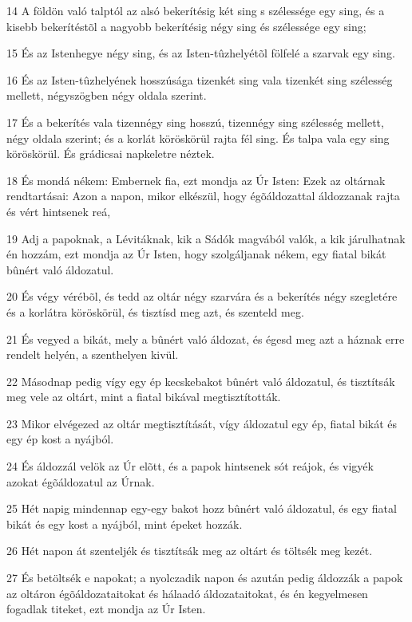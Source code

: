 \par 14 A földön való talptól az alsó bekerítésig két sing s szélessége egy sing, és a kisebb bekerítéstõl a nagyobb bekerítésig négy sing és szélessége egy sing;
\par 15 És az Istenhegye négy sing, és az Isten-tûzhelyétõl fölfelé a szarvak egy sing.
\par 16 És az Isten-tûzhelyének hosszúsága tizenkét sing vala tizenkét sing szélesség mellett, négyszögben négy oldala szerint.
\par 17 És a bekerítés vala tizennégy sing hosszú, tizennégy sing szélesség mellett, négy oldala szerint; és a korlát köröskörül rajta fél sing. És talpa vala egy sing köröskörül. És grádicsai napkeletre néztek.
\par 18 És mondá nékem: Embernek fia, ezt mondja az Úr Isten: Ezek az oltárnak rendtartásai: Azon a napon, mikor elkészül, hogy égõáldozattal áldozzanak rajta és vért hintsenek reá,
\par 19 Adj a papoknak, a Lévitáknak, kik a Sádók magvából valók, a kik járulhatnak én hozzám, ezt mondja az Úr Isten, hogy szolgáljanak nékem, egy fiatal bikát bûnért  való áldozatul.
\par 20 És végy vérébõl, és tedd az oltár négy szarvára és a bekerítés négy szegletére és a korlátra köröskörül, és tisztísd meg azt, és szenteld meg.
\par 21 És vegyed a bikát, mely a bûnért való áldozat, és égesd meg azt a háznak erre rendelt helyén, a szenthelyen kivül.
\par 22 Másodnap pedig vígy egy ép kecskebakot bûnért való áldozatul, és tisztítsák meg vele az oltárt, mint a fiatal bikával megtisztították.
\par 23 Mikor elvégezed az oltár megtisztítását, vígy áldozatul egy ép, fiatal bikát és egy ép kost a nyájból.
\par 24 És áldozzál velök az Úr elõtt, és a papok hintsenek sót reájok, és vigyék azokat égõáldozatul az Úrnak.
\par 25 Hét napig mindennap egy-egy bakot hozz bûnért való áldozatul, és egy fiatal bikát és egy kost a nyájból, mint épeket hozzák.
\par 26 Hét napon át szenteljék és tisztítsák meg az oltárt és töltsék meg kezét.
\par 27 És betöltsék e napokat; a nyolczadik napon és azután pedig áldozzák a papok az oltáron égõáldozataitokat és hálaadó áldozataitokat, és én kegyelmesen fogadlak titeket, ezt mondja az Úr Isten.

